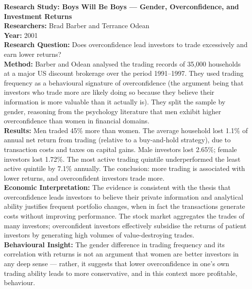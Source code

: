 \documentclass[12pt, letterpaper]{article}
\begin{document}
\begin{researchbox}
\textbf{Research Study: Boys Will Be Boys --- Gender, Overconfidence, and Investment Returns}\\[4pt]

\textbf{Researchers:} Brad Barber and Terrance Odean\\[4pt]
\textbf{Year:} 2001\\[4pt]
\textbf{Research Question:} Does overconfidence lead investors to trade excessively and earn lower returns?\\[4pt]
\textbf{Method:} Barber and Odean analysed the trading records of 35,000 households at a major US discount brokerage over the period 1991--1997. They used trading frequency as a behavioural signature of overconfidence (the argument being that investors who trade more are likely doing so because they believe their information is more valuable than it actually is). They split the sample by gender, reasoning from the psychology literature that men exhibit higher overconfidence than women in financial domains.\\[4pt]
\textbf{Results:} Men traded 45\% more than women. The average household lost 1.1\% of annual net return from trading (relative to a buy-and-hold strategy), due to transaction costs and taxes on capital gains. Male investors lost 2.65\%; female investors lost 1.72\%. The most active trading quintile underperformed the least active quintile by 7.1\% annually. The conclusion: more trading is associated with lower returns, and overconfident investors trade more.\\[4pt]
\textbf{Economic Interpretation:} The evidence is consistent with the thesis that overconfidence leads investors to believe their private information and analytical ability justifies frequent portfolio changes, when in fact the transactions generate costs without improving performance. The stock market aggregates the trades of many investors; overconfident investors effectively subsidise the returns of patient investors by generating high volumes of value-destroying trades.\\[4pt]
\textbf{Behavioural Insight:} The gender difference in trading frequency and its correlation with returns is not an argument that women are better investors in any deep sense --- rather, it suggests that lower overconfidence in one's own trading ability leads to more conservative, and in this context more profitable, behaviour.\\[4pt]
\end{researchbox}
\end{document}

